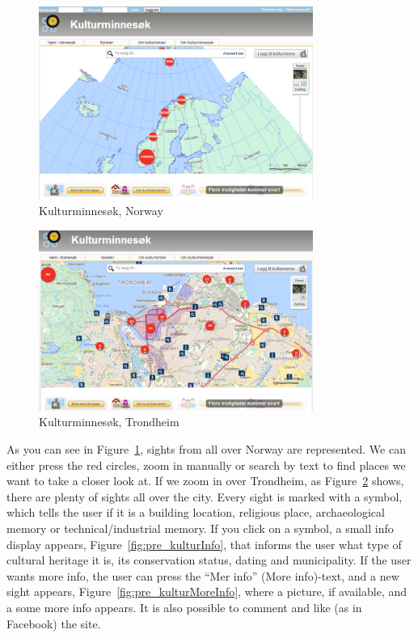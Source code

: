 \documentclass[11pt]{book}
\begin{document}
\begin{figure}[H]
      \centering
      \includegraphics[width=0.8\textwidth]{Figures/Prestudy/kulturminnesokOversikt.png}
      \caption{Kulturminnesøk, Norway}
      \label{fig:pre_kulturoversikt}
\end{figure}

\begin{figure}[H]
      \centering
      \includegraphics[width=0.8\textwidth]{Figures/Prestudy/kulturminnesokTrondheim.png}
      \caption{Kulturminnesøk, Trondheim}
      \label{fig:pre_kulturTrondheim}
\end{figure}

As you can see in Figure~\ref{fig:pre_kulturoversikt}, sights from all over Norway are represented. We can either press the red circles, zoom in manually or search by text to find places we want to take a closer look at. If we zoom in over Trondheim, as Figure~\ref{fig:pre_kulturTrondheim} shows, there are plenty of sights all over the city. Every sight is marked with a symbol, which tells the user if it is a building location, religious place, archaeological memory or technical/industrial memory. If you click on a symbol, a small info display appears, Figure~\ref{fig:pre_kulturInfo}, that informs the user what type of cultural heritage it is, its conservation status, dating and municipality. If the user wants more info, the user can press the ``Mer info'' (More info)-text, and  a new sight appears, Figure~\ref{fig:pre_kulturMoreInfo}, where a picture, if available, and a some more info appears. It is also possible to comment and like (as in Facebook) the site.
\end{document}

